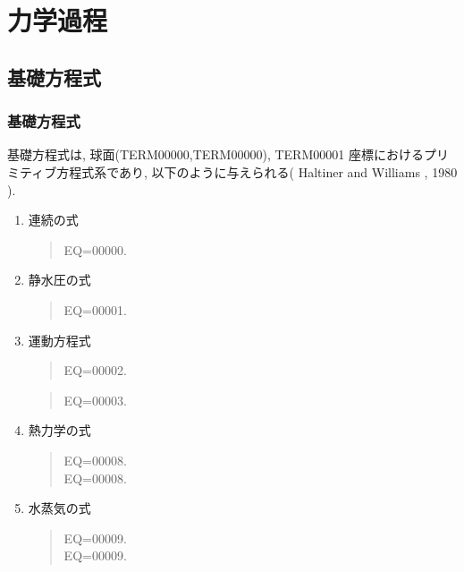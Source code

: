 ﻿
\section{力学過程}

\subsection{基礎方程式}

\subsubsection{基礎方程式}

基礎方程式は,
球面(TERM00000,TERM00000), TERM00001 座標におけるプリミティブ方程式系であり,
以下のように与えられる( Haltiner and Williams , 1980 ).


\begin{enumerate}
\item 連続の式

\begin{quote}
EQ=00000.
\label{質量}
\end{quote}

\item 静水圧の式

\begin{quote}
EQ=00001.
\label{静水圧}
\end{quote}


\item 運動方程式

\begin{quote}
EQ=00002.
\label{渦度}
\end{quote}
\begin{quote}
EQ=00003.
\label{発散}
\end{quote}


\item 熱力学の式

\begin{quote}
\label{熱力}
\nonumber
EQ=00008.\\
EQ=00008.
\end{quote}


\item 水蒸気の式

\begin{quote}
\label{水蒸気}
\nonumber
EQ=00009.\\
EQ=00009.
\end{quote}

\end{enumerate}

